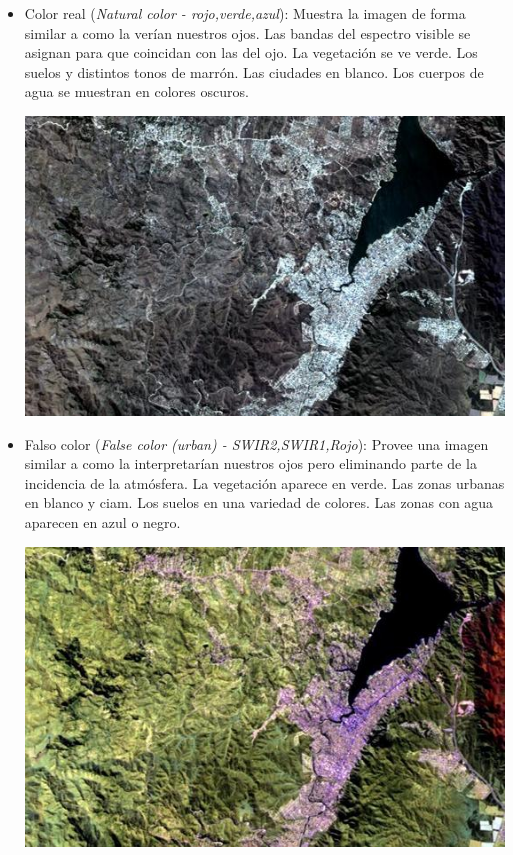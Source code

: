 \documentclass[a4paper,12pt]{book}
\begin{document}
\begin{itemize}
    \item Color real (\emph{Natural color - rojo,verde,azul}): Muestra la imagen de forma similar a como la verían nuestros ojos. Las bandas del espectro visible se asignan para que coincidan con  las del ojo. La vegetación se ve verde. Los suelos y distintos tonos de marrón. Las ciudades en blanco. Los cuerpos de agua se muestran en colores oscuros.
    \begin{center}\includegraphics[scale=0.3]{4-3-2.jpeg}\end{center}
    \item Falso color (\emph{False color (urban) - SWIR2,SWIR1,Rojo}): Provee una imagen similar a como la interpretarían nuestros ojos pero eliminando parte de la incidencia de la atmósfera. La vegetación aparece en verde. Las zonas urbanas en blanco y ciam. Los suelos en una variedad de colores. Las zonas con agua aparecen en azul o negro.
    \begin{center}\includegraphics[scale=0.3]{12-11-4.jpeg}\end{center}

\end{itemize}
\end{document}

